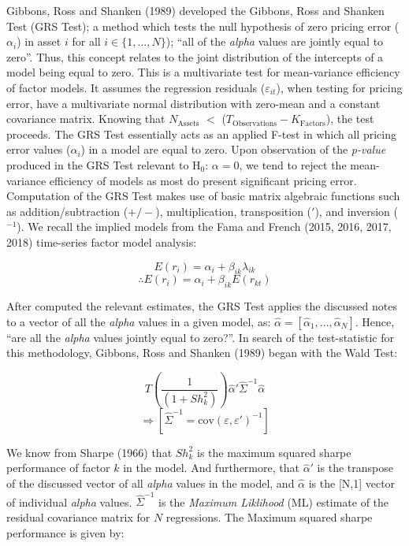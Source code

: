 \documentclass[11pt, english]{article}
\begin{document}
        Gibbons, Ross and Shanken (1989) developed the Gibbons, Ross and Shanken Test (GRS Test); a method which tests the null hypothesis of zero pricing error ($\alpha_i$) in asset $i$ for all $i\in\{1,...,N\}$); ``all of the \textit{alpha} values are jointly equal to zero''. Thus, this concept relates to the joint distribution of the intercepts of a model being equal to zero. This is a multivariate test for mean-variance efficiency of factor models. It assumes the regression residuals ($\varepsilon_{it}$), when testing for pricing error, have a multivariate normal distribution with zero-mean and a constant covariance matrix. Knowing that $N\mathrm{_{Assets}}$ $<$ ($T\mathrm{_{Observations}}-K\mathrm{_{Factors}}$), the test proceeds. The GRS Test essentially acts as an applied F-test in which all pricing error values ($\alpha_i$) in a model are equal to zero. Upon observation of the \textit{p-value} produced in the GRS Test relevant to H$_0$: $\alpha=0$, we tend to reject the mean-variance efficiency of models as most do present significant pricing error.\\

        Computation of the GRS Test makes use of basic matrix algebraic functions such as addition/subtraction ($+/-$), multiplication, transposition ($'$), and inversion ($^{-1}$). We recall the implied models from the Fama and French (2015, 2016, 2017, 2018) time-series factor model analysis:

        $$E(r_i)=\alpha_i+\beta_{ik}\lambda_{ik}$$
        $$\therefore E(r_i)=\alpha_i+\beta_{ik}E(r_{kt})$$

        After computed the relevant estimates, the GRS Test applies the discussed notes to a vector of all the \textit{alpha} values in a given model, as: $\hat{\alpha}=[\hat{\alpha}_1,...,\hat{\alpha}_N]$. Hence, ``are all the \textit{alpha} values jointly equal to zero?''. In search of the test-statistic for this methodology, Gibbons, Ross and Shanken (1989) began with the Wald Test:

        $$T\left(\frac{1}{(1+Sh_k^2)}\right)\hat{\alpha}'\hat{\Sigma}^{-1}\hat{\alpha}$$
        $$\Rightarrow[\hat{\Sigma}^{-1}=\mathrm{cov}(\varepsilon,\varepsilon')^{-1}]$$

        We know from Sharpe (1966) that $Sh_k^2$ is the maximum squared sharpe performance of factor $k$ in the model. And furthermore, that $\hat{\alpha}'$ is the transpose of the discussed vector of all \textit{alpha} values in the model, and $\hat{\alpha}$ is the [N,1] vector of individual \textit{alpha} values. $\hat{\Sigma}^{-1}$ is the \textit{Maximum Liklihood} (ML) estimate of the residual covariance matrix for $N$ regressions. The Maximum squared sharpe performance is given by:
\end{document}
